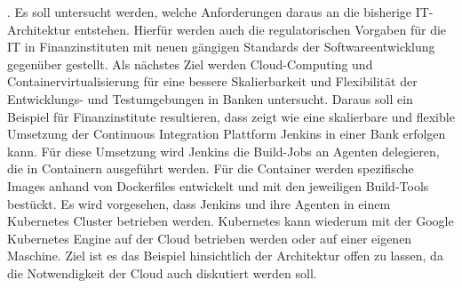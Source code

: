 . Es soll untersucht werden, welche Anforderungen daraus an die bisherige IT-Architektur entstehen. Hierfür werden auch die regulatorischen Vorgaben für die IT in Finanzinstituten mit neuen gängigen Standards der Softwareentwicklung gegenüber gestellt. 
Als nächstes Ziel werden Cloud-Computing und Containervirtualisierung für eine bessere Skalierbarkeit und Flexibilität der Entwicklungs- und Testumgebungen in Banken untersucht. Daraus soll ein Beispiel für Finanzinstitute resultieren, dass zeigt wie eine skalierbare und flexible Umsetzung der Continuous Integration Plattform Jenkins in einer Bank erfolgen kann. Für diese Umsetzung wird Jenkins die Build-Jobs an Agenten delegieren, die in Containern ausgeführt werden. Für die Container werden spezifische Images anhand von Dockerfiles entwickelt und mit den jeweiligen Build-Tools bestückt. Es wird vorgesehen, dass Jenkins und ihre Agenten in einem Kubernetes Cluster betrieben werden. Kubernetes kann wiederum mit der Google Kubernetes Engine auf der Cloud betrieben werden oder auf einer eigenen Maschine. Ziel ist es das Beispiel hinsichtlich der Architektur offen zu lassen, da die Notwendigkeit der Cloud auch diskutiert werden soll. 
%
%
